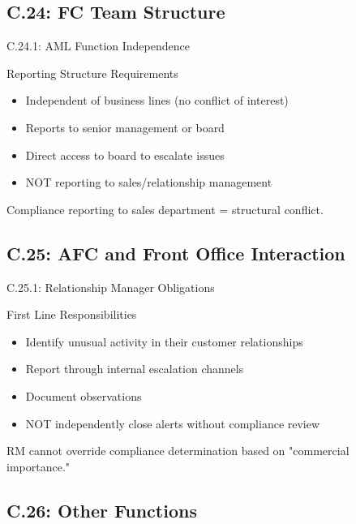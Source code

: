 \documentclass{beamer}
\begin{document}
		\subsection{C.24: FC Team Structure}
		
		\begin{frame}{C.24.1: AML Function Independence}
			\begin{block}{Reporting Structure Requirements}
				\begin{itemize}
					\item Independent of business lines (no conflict of interest)
					\item Reports to senior management or board
					\item Direct access to board to escalate issues
					\item NOT reporting to sales/relationship management
				\end{itemize}
			\end{block}
			\textbf{} Compliance reporting to sales department = structural conflict.
		\end{frame}
		
		\subsection{C.25: AFC and Front Office Interaction}
		
		\begin{frame}{C.25.1: Relationship Manager Obligations}
			\begin{block}{First Line Responsibilities}
				\begin{itemize}
					\item Identify unusual activity in their customer relationships
					\item Report through internal escalation channels
					\item Document observations
					\item NOT independently close alerts without compliance review
				\end{itemize}
			\end{block}
			\textbf{} RM cannot override compliance determination based on "commercial importance."
		\end{frame}
		
		\subsection{C.26: Other Functions}
		
\end{document}

